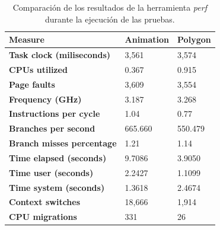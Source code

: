 \begin{table}[htp]
\centering


    
    \begin{center}
    \begin{tabular}{ | l | l | l | }
        
        
        \hline
        \textbf{Measure} & \textbf{Animation}  & \textbf{Polygon} \\
        \hline
        \textbf{Task clock (miliseconds)}  & 3,561 & 3,574 \\
        \hline
        \textbf{CPUs utilized}  & 0.367 & 0.915 \\
        \hline
        \textbf{Page faults} & 3,609  & 3,554\\
        \hline
        \textbf{Frequency (GHz)} & 3.187 & 3.268 \\
        \hline
        \textbf{Instructions per cycle} & 1.04 & 0.77 \\
        \hline
        \textbf{Branches per second} & 665.660 & 550.479 \\
        \hline
        \textbf{Branch misses percentage} & 1.21 & 1.14 \\
        \hline
        \textbf{Time elapsed (seconds)} & 9.7086 & 3.9050 \\
        \hline
        \textbf{Time user (seconds)} & 2.2427 & 1.1099 \\
        \hline
        \textbf{Time system (seconds)} & 1.3618 & 2.4674 \\
        \hline
        \textbf{Context switches} & 18,666 & 1,914 \\
        \hline
        \textbf{CPU migrations} & 331 & 26 \\
        \hline
        
    \end{tabular} 
    \end{center}
    
    \caption{Comparación de los resultados de la herramienta \textit{perf} durante la ejecución de las pruebas.}
    
    \label{tbl:perf-comparison}
\end{table}